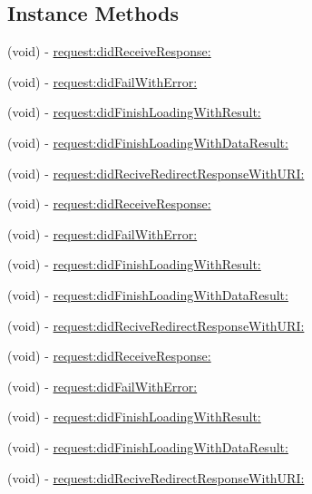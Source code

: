 \subsection*{Instance Methods}
\begin{DoxyCompactItemize}
\item 
(void) -\/ \mbox{\hyperlink{protocol_w_b_http_request_delegate_01-p_af9e98d40b55162297757fc2e27d0513e}{request\+:did\+Receive\+Response\+:}}
\item 
(void) -\/ \mbox{\hyperlink{protocol_w_b_http_request_delegate_01-p_a1d6301f145c81842890d428579020c30}{request\+:did\+Fail\+With\+Error\+:}}
\item 
(void) -\/ \mbox{\hyperlink{protocol_w_b_http_request_delegate_01-p_af87fe20c34dd9d1ae9a131eea9cec654}{request\+:did\+Finish\+Loading\+With\+Result\+:}}
\item 
(void) -\/ \mbox{\hyperlink{protocol_w_b_http_request_delegate_01-p_adb2c6d41767770c8c9b965a02b4789c2}{request\+:did\+Finish\+Loading\+With\+Data\+Result\+:}}
\item 
(void) -\/ \mbox{\hyperlink{protocol_w_b_http_request_delegate_01-p_a6ffae01d073b8ac55c7bdf8e62ca9576}{request\+:did\+Recive\+Redirect\+Response\+With\+U\+R\+I\+:}}
\item 
(void) -\/ \mbox{\hyperlink{protocol_w_b_http_request_delegate_01-p_af9e98d40b55162297757fc2e27d0513e}{request\+:did\+Receive\+Response\+:}}
\item 
(void) -\/ \mbox{\hyperlink{protocol_w_b_http_request_delegate_01-p_a1d6301f145c81842890d428579020c30}{request\+:did\+Fail\+With\+Error\+:}}
\item 
(void) -\/ \mbox{\hyperlink{protocol_w_b_http_request_delegate_01-p_af87fe20c34dd9d1ae9a131eea9cec654}{request\+:did\+Finish\+Loading\+With\+Result\+:}}
\item 
(void) -\/ \mbox{\hyperlink{protocol_w_b_http_request_delegate_01-p_adb2c6d41767770c8c9b965a02b4789c2}{request\+:did\+Finish\+Loading\+With\+Data\+Result\+:}}
\item 
(void) -\/ \mbox{\hyperlink{protocol_w_b_http_request_delegate_01-p_a6ffae01d073b8ac55c7bdf8e62ca9576}{request\+:did\+Recive\+Redirect\+Response\+With\+U\+R\+I\+:}}
\item 
(void) -\/ \mbox{\hyperlink{protocol_w_b_http_request_delegate_01-p_af9e98d40b55162297757fc2e27d0513e}{request\+:did\+Receive\+Response\+:}}
\item 
(void) -\/ \mbox{\hyperlink{protocol_w_b_http_request_delegate_01-p_a1d6301f145c81842890d428579020c30}{request\+:did\+Fail\+With\+Error\+:}}
\item 
(void) -\/ \mbox{\hyperlink{protocol_w_b_http_request_delegate_01-p_af87fe20c34dd9d1ae9a131eea9cec654}{request\+:did\+Finish\+Loading\+With\+Result\+:}}
\item 
(void) -\/ \mbox{\hyperlink{protocol_w_b_http_request_delegate_01-p_adb2c6d41767770c8c9b965a02b4789c2}{request\+:did\+Finish\+Loading\+With\+Data\+Result\+:}}
\item 
(void) -\/ \mbox{\hyperlink{protocol_w_b_http_request_delegate_01-p_a6ffae01d073b8ac55c7bdf8e62ca9576}{request\+:did\+Recive\+Redirect\+Response\+With\+U\+R\+I\+:}}
\end{DoxyCompactItemize}


